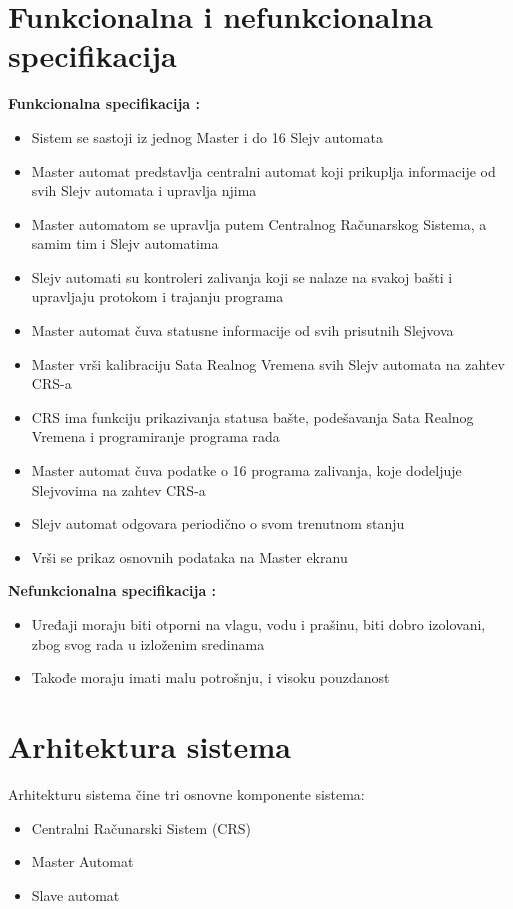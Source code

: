\documentclass[12pt]{article}
\numberwithin{figure}{section}
\begin{document}
\section{Funkcionalna i nefunkcionalna specifikacija}
\textbf{Funkcionalna specifikacija :}
  \begin{itemize}
  \item{Sistem se sastoji iz jednog Master i do 16 Slejv automata}
  \item{Master automat predstavlja centralni automat koji prikuplja informacije od svih Slejv automata i upravlja njima}
  \item{Master automatom se upravlja putem Centralnog Računarskog Sistema, a samim tim i Slejv automatima}
  \item{Slejv automati su kontroleri zalivanja koji se nalaze na svakoj bašti i upravljaju protokom i trajanju programa}
  \item{Master automat čuva statusne informacije od svih prisutnih Slejvova}
 \item{Master vrši kalibraciju Sata Realnog Vremena svih Slejv automata na zahtev CRS-a}
 \item{CRS ima funkciju prikazivanja statusa bašte, podešavanja Sata Realnog Vremena i programiranje programa rada}
  \item{Master automat čuva podatke o 16 programa zalivanja, koje dodeljuje Slejvovima na zahtev CRS-a}
  \item{Slejv automat odgovara periodično o svom trenutnom stanju}
  \item{Vrši se prikaz osnovnih podataka na Master ekranu}
\end{itemize}
\textbf{Nefunkcionalna specifikacija :}
\begin{itemize}
  \item{Uređaji moraju biti otporni na vlagu, vodu i prašinu, biti dobro izolovani, zbog svog rada u izloženim sredinama}
  \item{Takođe moraju imati malu potrošnju, i visoku pouzdanost}
\end{itemize}
\newpage
\section{Arhitektura sistema}
  Arhitekturu sistema čine tri osnovne komponente sistema: 
  \begin{itemize}
    \item{Centralni Računarski Sistem (CRS)}
    \item{Master Automat}
    \item{Slave automat}
  \end{itemize}
\end{document}
